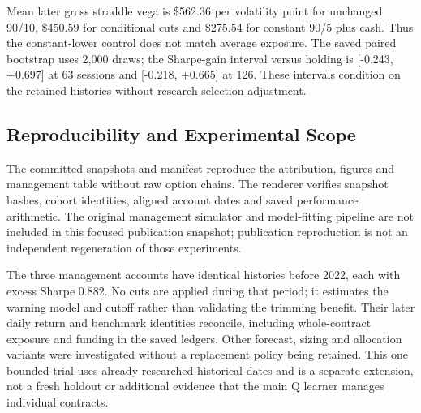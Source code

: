 Mean later gross straddle vega is \$562.36 per volatility point for unchanged 90/10, \$450.59 for conditional cuts and \$275.54 for constant 90/5 plus cash. Thus the constant-lower control does not match average exposure. The saved paired bootstrap uses 2,000 draws; the Sharpe-gain interval versus holding is [-0.243, +0.697] at 63 sessions and [-0.218, +0.665] at 126. These intervals condition on the retained histories without research-selection adjustment.


\subsection*{Reproducibility and Experimental Scope}

The committed  snapshots and manifest reproduce the attribution, figures and management table without raw option chains. The renderer verifies snapshot hashes, cohort identities, aligned account dates and saved performance arithmetic. The original management simulator and model-fitting pipeline are not included in this focused publication snapshot; publication reproduction is not an independent regeneration of those experiments.


The three management accounts have identical histories before 2022, each with excess Sharpe 0.882. No cuts are applied during that period; it estimates the warning model and cutoff rather than validating the trimming benefit. Their later daily return and benchmark identities reconcile, including whole-contract exposure and funding in the saved ledgers. Other forecast, sizing and allocation variants were investigated without a replacement policy being retained. This one bounded trial uses already researched historical dates and is a separate extension, not a fresh holdout or additional evidence that the main Q learner manages individual contracts.


\FloatBarrier
